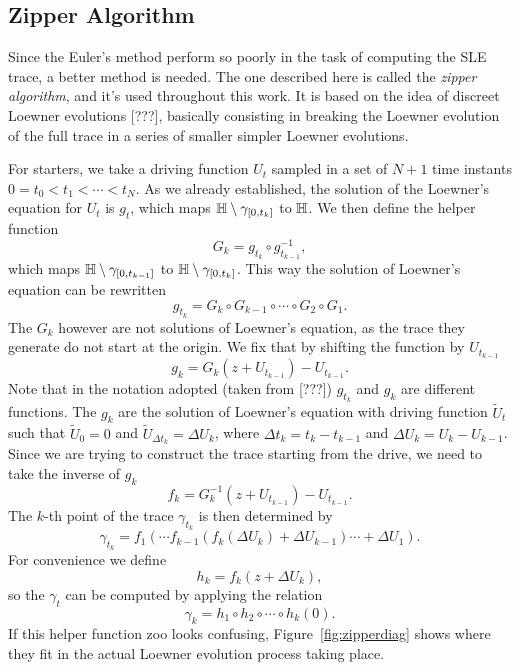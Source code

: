 \subsection{Zipper Algorithm}
\label{ss:zipper}

Since the Euler's method perform so poorly in the task of computing the SLE
trace, a better method is needed. The one described here is called the
\textit{zipper algorithm}, and it's used throughout this work. It is based on
the idea of discreet Loewner evolutions [???], basically consisting in breaking
the Loewner evolution of the full trace in a series of smaller simpler Loewner
evolutions.

For starters, we take a driving function $U_t$ sampled in a set of $N+1$ time
instants $0=t_0<t_1<\cdots<t_N$. As we already established, the solution of the
Loewner's equation for $U_t$ is $g_t$, which maps
$\mathbb{H}\setminus\gamma_{\left[0,t_{k}\right]}$ to $\mathbb{H}$. We then define the
helper function
\begin{equation}
    G_{k}=g_{t_{k}}\circ g_{t_{k-1}}^{-1},
\end{equation}
which maps $\mathbb{H}\setminus\gamma_{\left[0,t_{k-1}\right]}$ to
$\mathbb{H}\setminus\gamma_{\left[0,t_{k}\right]}$. This way the solution of Loewner's
equation can be rewritten
\begin{equation}
    g_{t_{k}}=G_{k}\circ G_{k-1}\circ\cdots\circ G_{2}\circ G_{1}.
\end{equation}
The $G_k$ however are not solutions of Loewner's equation, as the trace they
generate do not start at the origin. We fix that by shifting the function by
$U_{t_{k-1}}$
\begin{equation}
    g_{k}=G_{k}\left(z+U_{t_{k-1}}\right)-U_{t_{k-1}}.
\end{equation}
Note that in the notation adopted (taken from [???]) $g_{t_k}$ and $g_k$ are
different functions. The $g_k$ are the solution of Loewner's equation with
driving function $\tilde{U}_t$ such that $\tilde{U}_0=0$ and $\tilde{U}_{\Delta
t_k} = \Delta U_k$, where $\Delta t_k = t_{k} - t_{k-1}$ and $\Delta U_{k}
= U_{k} - U_{k-1}$. Since we are trying to construct the trace starting from
the drive, we need to take the inverse of $g_k$
\begin{equation}
    f_{k}=G_{k}^{-1}\left(z+U_{t_{k-1}}\right)-U_{t_{k-1}}.
\end{equation}
The $k$-th point of the trace $\gamma_{t_k}$ is then determined by 
\begin{equation}
    \gamma_{t_k} = f_1(\cdots f_{k-1}(f_k(\Delta U_k)+\Delta U_{k-1})\cdots+\Delta U_1).
\end{equation}
For convenience we define
\begin{equation}
    h_{k}=f_{k}\left(z+\Delta U_{k}\right),
\end{equation}
so the $\gamma_t$ can be computed by applying the relation
\begin{equation}
    \label{eq:zip}
    \gamma_{k}=h_{1}\circ h_{2}\circ\cdots\circ h_{k}\left(0\right).
\end{equation}
If this helper function zoo looks confusing, Figure~\ref{fig:zipperdiag} shows
where they fit in the actual Loewner evolution process taking place.

